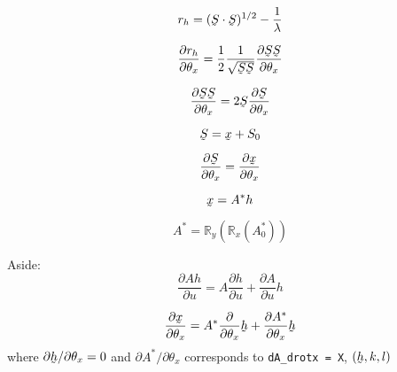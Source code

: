\documentclass[12pt, letterpaper]{article}
\begin{document}
\begin{equation}
  r_{h} = (\underaccent{\tilde}{S} \cdot \underaccent{\tilde}{S})^{1 / 2} -
          \frac{1}{\lambda}
\end{equation}

\begin{equation}
  \frac{\partial r_{h}}{\partial \theta_{x}}
    = \frac{1}{2}
      \frac{1}{\sqrt{\underaccent{\tilde}{S} \underaccent{\tilde}{S}}}
      \frac{\partial \underaccent{\tilde}{S} \underaccent{\tilde}{S}}
           {\partial \theta_{x}}
\end{equation}

\begin{equation}
  \frac{\partial \underaccent{\tilde}{S} \underaccent{\tilde}{S}}
       {\partial \theta_{x}}
    = 2 \underaccent{\tilde}{S}
      \frac{\partial \underaccent{\tilde}{S}}{\partial \theta_{x}}
\end{equation}

\begin{equation}
  \underaccent{\tilde}{S} = \underaccent{\tilde}{x} + S_{0}
\end{equation}


\begin{equation}
  \frac{\partial \underaccent{\tilde}{S}}{\partial \theta_{x}}
    = \frac{\partial \underaccent{\tilde}{x}}{\partial \theta_{x}}
\end{equation}

\begin{equation}
  \underaccent{\tilde}{x} = A^{*} h
\end{equation}

\begin{equation}
  A^{*} = \mathbb{R}_{y} ( \mathbb{R}_{x} ( A_{0}^{*} ) )
\end{equation}

Aside:
\begin{equation}
  \frac{\partial A h}{\partial u}
    = A \frac{\partial h}{\partial u} +
      \frac{\partial A}{\partial u} h
\end{equation}

\begin{equation}
  \frac{\partial \underaccent{\tilde}{x}}{\partial \theta_{x}}
    = A^{*} \frac{\partial}{\partial \theta_{x}} \underaccent{\tilde}{h} +
      \frac{\partial A^{*}}{\partial \theta_{x}} \underaccent{\tilde}{h}
\end{equation}
where $\partial \underaccent{\tilde}{h} / \partial \theta_{x} = 0$ and
$\partial A^{*} / \partial \theta_{x}$ corresponds to
\texttt{dA\_drotx = X}, $( \underaccent{\tilde}{h}, k, l )$
\end{document}
